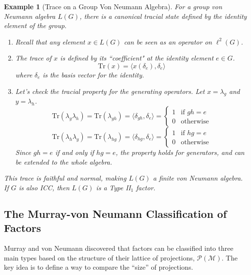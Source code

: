\documentclass[11pt, a4paper]{article}
\theoremstyle{colored_def}
\theoremstyle{colored_thm}
\theoremstyle{colored_ex}
\newtheorem{example}{Example}[section]
\newcommand{\Tr}{\text{Tr}}
\newcommand{\M}{\mathcal{M}}
\begin{document}
\begin{example}[Trace on a Group Von Neumann Algebra]\label{ex:trace-group-algebra}
For a group von Neumann algebra $L(G)$, there is a canonical tracial state defined by the identity element of the group.
\begin{enumerate}
    \item Recall that any element $x \in L(G)$ can be seen as an operator on $\ell^2(G)$.
    \item The trace of $x$ is defined by its ``coefficient" at the identity element $e \in G$.
    $$ \Tr(x) = \langle x(\delta_e), \delta_e \rangle $$ 
    where $\delta_e$ is the basis vector for the identity.
    \item Let's check the tracial property for the generating operators. Let $x = \lambda_g$ and $y = \lambda_h$.
    $$ \Tr(\lambda_g \lambda_h) = \Tr(\lambda_{gh}) = \langle \delta_{gh}, \delta_e \rangle = \begin{cases} 1 & \text{if } gh = e \\ 0 & \text{otherwise} \end{cases} $$
    $$ \Tr(\lambda_h \lambda_g) = \Tr(\lambda_{hg}) = \langle \delta_{hg}, \delta_e \rangle = \begin{cases} 1 & \text{if } hg = e \\ 0 & \text{otherwise} \end{cases} $$
    Since $gh=e$ if and only if $hg=e$, the property holds for generators, and can be extended to the whole algebra.
\end{enumerate}
This trace is faithful and normal, making $L(G)$ a finite von Neumann algebra. If $G$ is also ICC, then $L(G)$ is a Type II$_1$ factor.
\end{example}

\subsection{The Murray-von Neumann Classification of Factors}

Murray and von Neumann discovered that factors can be classified into three main types based on the structure of their lattice of projections, $\mathcal{P}(\M)$. The key idea is to define a way to compare the ``size'' of projections.
\end{document}
